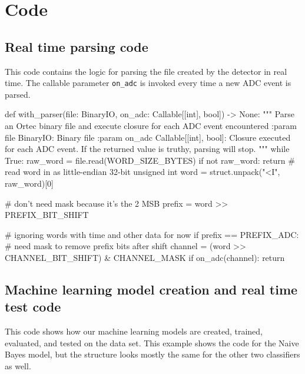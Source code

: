 \documentclass[onecolumn, draftclsnofoot,10pt, compsoc]{IEEEtran}
\begin{document}
\section{Code}
\subsection{Real time parsing code}
This code contains the logic for parsing the file created by the detector in real time.
The callable parameter \texttt{on\_adc} is invoked every time a new ADC event is parsed.

\begin{python}
def with_parser(file: BinaryIO, on_adc: Callable[[int], bool]) -> None:
    """
    Parse an Ortec binary file and execute closure for each ADC event
    encountered
    :param file BinaryIO: Binary file
    :param on_adc Callable[[int], bool]: Closure executed for each ADC event.
    If the returned value is truthy, parsing will stop.
    """
    while True:
        raw_word = file.read(WORD_SIZE_BYTES)
        if not raw_word:
            return
        # read word in as little-endian 32-bit unsigned int
        word = struct.unpack("<I", raw_word)[0]

        # don't need mask because it's the 2 MSB
        prefix = word >> PREFIX_BIT_SHIFT

        # ignoring words with time and other data for now
        if prefix == PREFIX_ADC:
            # need mask to remove prefix bits after shift
            channel = (word >> CHANNEL_BIT_SHIFT) & CHANNEL_MASK
            if on_adc(channel):
                return
\end{python}

\subsection{Machine learning model creation and real time test code}
This code shows how our machine learning models are created, trained, evaluated, and tested on the data set.
This example shows the code for the Naive Bayes model, but the structure looks mostly the same for the other two classifiers as well.
\end{document}
